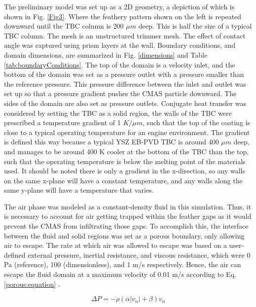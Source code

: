 \documentclass[conf]{new-aiaa}
\begin{document}
The preliminary model was  set up as a 2D geometry, a depiction of which is shown in Fig. \ref{Fig3}. Where the feathery pattern shown on the left is repeated downward until the TBC column is 200 $\mu m$ deep. This is half the size of a typical TBC column. The mesh is an unstructured trimmer mesh. The effect of contact angle was captured using prism layers at the wall. Boundary conditions, and domain dimensions, are summarized in Fig. \ref{dimensions} and Table \ref{tab:boundaryConditions}. The top of the domain is a velocity inlet, and the bottom of the domain was set as a pressure outlet with a pressure smaller than the reference pressure. This pressure difference between the inlet and outlet was set up so that a pressure gradient pushes the CMAS particle downward. The sides of the domain are also set as pressure outlets. Conjugate heat transfer was considered by setting the TBC as a solid region, the walls of the TBC were prescribed a temperature gradient of 1 $K/\mu m$, such that the top of the coating is close to a typical operating temperature for an engine environment. The gradient is defined this way because a typical YSZ EB-PVD TBC is around 400 $\mu m$ deep, and manages to be around 400 K cooler at the bottom of the TBC than the top, such that the operating temperature is below the melting point of the materials used. It should be noted there is only a gradient in the x-direction, so any walls on the same x-plane will have a constant temperature, and any walls along the same y-plane will have a temperature that varies.

The air phase was modeled as a constant-density fluid in this simulation. Thus, it is necessary to account for air getting trapped within the feather gaps as it would prevent the CMAS from infiltrating those gaps. To accomplish this, the interface between the fluid and solid regions was set as a porous boundary, only allowing air to escape. The rate at which air was allowed to escape was based on a user-defined external pressure, inertial resistance, and viscous resistance, which were 0 Pa (reference), 100 (dimensionless), and 1 m/s respectively. Hence, the air can escape the fluid domain at a maximum velocity of 0.01 m/s according to Eq. \ref{porous:equation} \cite{starccm}.

\begin{equation}
\label{porous:equation}
    \Delta P = -\rho (\alpha |v_n| + \beta)v_n
\end{equation}
\end{document}
